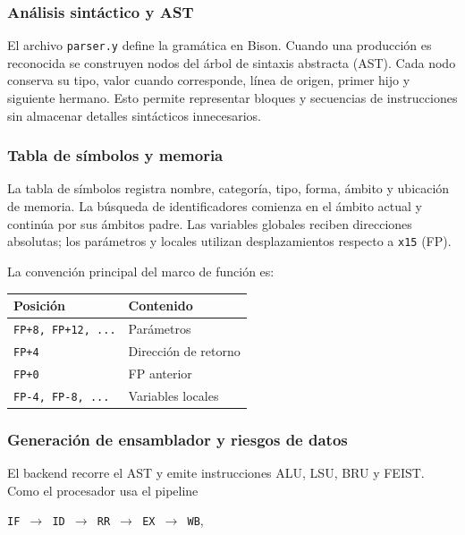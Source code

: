 \documentclass[11pt,letterpaper]{article}
\begin{document}
\subsubsection{Análisis sintáctico y AST}

El archivo \texttt{parser.y} define la gramática en Bison. Cuando una producción es reconocida se construyen nodos del árbol de sintaxis abstracta (AST). Cada nodo conserva su tipo, valor cuando corresponde, línea de origen, primer hijo y siguiente hermano. Esto permite representar bloques y secuencias de instrucciones sin almacenar detalles sintácticos innecesarios.

\subsubsection{Tabla de símbolos y memoria}

La tabla de símbolos registra nombre, categoría, tipo, forma, ámbito y ubicación de memoria. La búsqueda de identificadores comienza en el ámbito actual y continúa por sus ámbitos padre. Las variables globales reciben direcciones absolutas; los parámetros y locales utilizan desplazamientos respecto a \texttt{x15} (FP).

La convención principal del marco de función es:

\begin{center}
\begin{tabular}{ll}
\toprule
\textbf{Posición} & \textbf{Contenido} \\
\midrule
\texttt{FP+8, FP+12, ...} & Parámetros \\
\texttt{FP+4} & Dirección de retorno \\
\texttt{FP+0} & FP anterior \\
\texttt{FP-4, FP-8, ...} & Variables locales \\
\bottomrule
\end{tabular}
\end{center}

\subsubsection{Generación de ensamblador y riesgos de datos}

El backend recorre el AST y emite instrucciones ALU, LSU, BRU y FEIST. Como el procesador usa el pipeline

\begin{center}
\texttt{IF $\rightarrow$ ID $\rightarrow$ RR $\rightarrow$ EX $\rightarrow$ WB},
\end{center}
\end{document}
